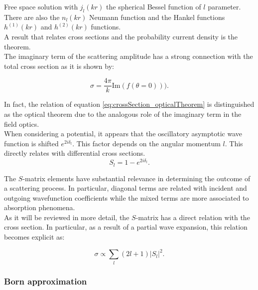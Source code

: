 \documentclass[openany]{book}
\begin{document}
Free space solution with $j_l(kr)$ the spherical Bessel function of $l$ parameter. There are also the $n_l(kr)$ Neumann function and the Hankel functions $h^{(1)}(kr)$ and $h^{(2)}(kr)$ functions. \\

A result that relates cross sections and the probability current density is the theorem. \\

The imaginary term of the scattering amplitude has a strong connection with the total cross section as it is shown by: 

\begin{equation}  \label{eq:crossSection_opticalTheorem}
	\sigma = \frac{4 \pi }{k} \mathrm{Im}(f(\theta = 0))).
\end{equation}

In fact, the relation of equation \ref{eq:crossSection_opticalTheorem} is distinguished as the optical theorem due to the analogous role of the imaginary term in the field optics. \\

When considering a potential, it appears that the oscillatory asymptotic wave function is shifted $e^{2i\delta_l}$. This factor depends on the angular momentum $l$. This directly relates with differential cross sections. \\

\begin{equation}  \label{eq:crossSection_Smatrix_definition}
	S_l = 1 - e^{2i\delta_l}.
\end{equation}

The $S$-matrix elements have substantial relevance in determining the outcome of a scattering process. In particular, diagonal terms are related with incident and outgoing wavefunction coefficients while the mixed terms are more associated to absorption phenomena. \\

As it will be reviewed in more detail, the $S$-matrix has a direct relation with the cross section. In particular, as a result of a partial wave expansion, this relation becomes explicit as:

\begin{equation}  \label{eq:crossSection_Smatrix_relation}
	\sigma \propto \sum_{l} (2l + 1) |S_l|^2. 
\end{equation}

\subsubsection{Born approximation}
\end{document}
